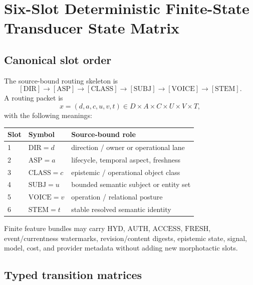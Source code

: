 \documentclass[11pt]{article}
\begin{document}
\section{Six-Slot Deterministic Finite-State Transducer State Matrix}

\subsection{Canonical slot order}

The source-bound routing skeleton is
\[
[\mathrm{DIR}]\rightarrow[\mathrm{ASP}]\rightarrow[\mathrm{CLASS}]
\rightarrow[\mathrm{SUBJ}]\rightarrow[\mathrm{VOICE}]\rightarrow[\mathrm{STEM}].
\]
A routing packet is
\[
x=(d,a,c,u,v,t)\in D\times A\times C\times U\times V\times T,
\]
with the following meanings:

\begin{center}
\begin{tabular}{@{}lll@{}}
\toprule
Slot & Symbol & Source-bound role\\
\midrule
1 & \(\mathrm{DIR}=d\) & direction / owner or operational lane\\
2 & \(\mathrm{ASP}=a\) & lifecycle, temporal aspect, freshness\\
3 & \(\mathrm{CLASS}=c\) & epistemic / operational object class\\
4 & \(\mathrm{SUBJ}=u\) & bounded semantic subject or entity set\\
5 & \(\mathrm{VOICE}=v\) & operation / relational posture\\
6 & \(\mathrm{STEM}=t\) & stable resolved semantic identity\\
\bottomrule
\end{tabular}
\end{center}

Finite feature bundles may carry \(\mathrm{HYD}\), \(\mathrm{AUTH}\),
\(\mathrm{ACCESS}\), \(\mathrm{FRESH}\), event/currentness watermarks,
revision/content digests, epistemic state, signal, model, cost, and provider
metadata without adding new morphotactic slots.

\subsection{Typed transition matrices}
\end{document}
